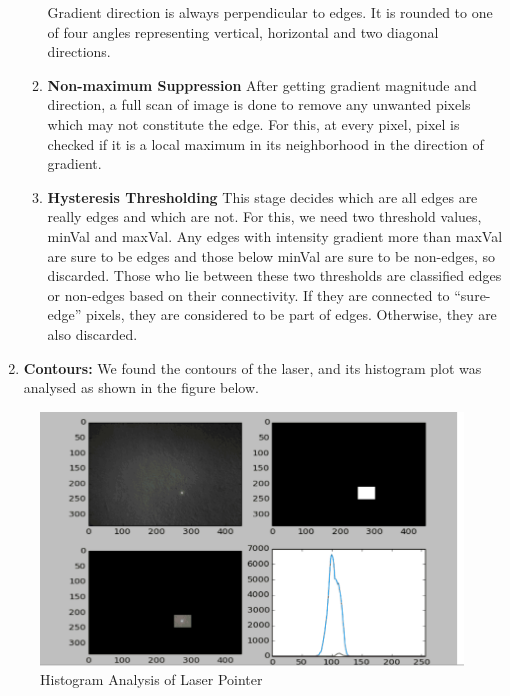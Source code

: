 \documentclass[12pt, a4paper]{article}
\begin{document}
\begin{enumerate}
\begin{enumerate}
Gradient direction is always perpendicular to edges. It is rounded to one of four angles   representing vertical, horizontal and two diagonal directions.
\item \textbf{Non-maximum Suppression}
After getting gradient magnitude and direction, a full scan of image is done to remove any unwanted pixels which may not constitute the edge. For this, at every pixel, pixel is checked ­if it is a local maximum in its neighborhood in the direction of gradient.

\item \textbf{Hysteresis Thresholding}
This stage decides which are all edges are really edges and which are not. For this, we need two threshold values, minVal and maxVal. Any edges with intensity gradient more than maxVal are sure to be edges and those below minVal are sure to be non-edges, so discarded. Those who lie between these two thresholds are classified edges or non-edges based on their connectivity. If they are connected to “sure-edge” pixels, they are considered to be part of edges. Otherwise, they are also discarded.
\end{enumerate}
\item \textbf{Contours:}
We found the contours of the laser, and its histogram plot was analysed as shown in the figure below.
\end{enumerate}


\begin{figure}[htp]
	\centering
	\includegraphics[scale=0.35]{histogram.png}
	\caption{Histogram Analysis of Laser Pointer}
	\label{}
\end{figure}
\end{document}
